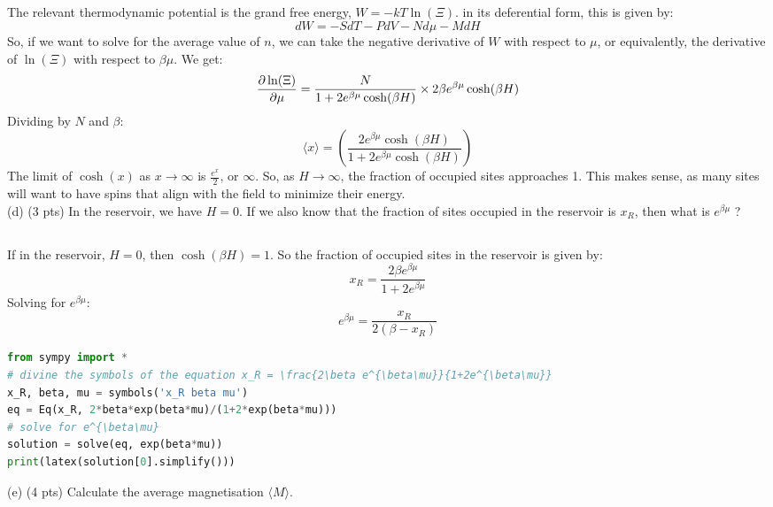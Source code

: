 \documentclass[10pt]{article}
\begin{document}
\subsection{}
The relevant thermodynamic potential is the grand free energy, $W = -kT \ln(\Xi)$. in its deferential form, this is given by:
\begin{equation}
  dW = -S dT - P dV - N d\mu - M dH
\end{equation}
So, if we want to solve for the average value of $n$, we can take the negative derivative of $W$ with respect to $\mu$, or equivalently, the derivative of $\ln(\Xi)$ with respect to $\beta\mu$. We get:
\begin{equation}
  \pdv{\ln(\Xi)}{\mu} = \frac{N}{1+2e^{\beta\mu}\cosh(\beta H)} \times 2\beta e^{\beta\mu}\cosh(\beta H)
\end{equation}
Dividing by $N$ and $\beta$:
\begin{equation}
  \langle x \rangle = \left( \frac{2e^{\beta\mu}\cosh(\beta H)}{1+2e^{\beta\mu}\cosh(\beta H)} \right)
\end{equation}
The limit of $\cosh(x)$ as $x \rightarrow \infty$ is $\frac{e^x}{2}$, or $\infty$. So, as $H \rightarrow \infty$, the fraction of occupied sites approaches 1. This makes sense, as many sites will want to have spins that align with the field to minimize their energy.\\
(d) (3 pts) In the reservoir, we have $H=0$. If we also know that the fraction of sites occupied in the reservoir is $x_{R}$, then what is $e^{\beta \mu}$ ?
\subsection{}
If in the reservoir, $H=0$, then $\cosh(\beta H) = 1$. So the fraction of occupied sites in the reservoir is given by:
\begin{equation}
  x_R = \frac{2\beta e^{\beta\mu}}{1+2e^{\beta\mu}}
\end{equation}
Solving for $e^{\beta\mu}$:
\begin{equation}
  e^{\beta\mu} = \frac{x_{R}}{2 \left(\beta - x_{R}\right)}
\end{equation}
\begin{lstlisting}[language=Python]
from sympy import *
# divine the symbols of the equation x_R = \frac{2\beta e^{\beta\mu}}{1+2e^{\beta\mu}}
x_R, beta, mu = symbols('x_R beta mu')
eq = Eq(x_R, 2*beta*exp(beta*mu)/(1+2*exp(beta*mu)))
# solve for e^{\beta\mu}
solution = solve(eq, exp(beta*mu))
print(latex(solution[0].simplify()))
\end{lstlisting}
(e) (4 pts) Calculate the average magnetisation $\langle M\rangle$.
\end{document}
